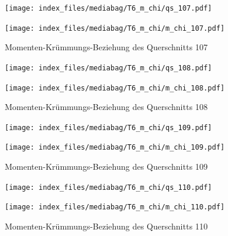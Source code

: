 \documentclass[
  11pt,
  letterpaper,
]{scrreprt}
\begin{document}
\begin{figure}[H]

\begin{minipage}{0.50\linewidth}
\texttt{[image: index\_files/mediabag/T6\_m\_chi/qs\_107.pdf]}\end{minipage}%
%
\begin{minipage}{0.50\linewidth}
\texttt{[image: index\_files/mediabag/T6\_m\_chi/m\_chi\_107.pdf]}\end{minipage}%

\caption{\label{fig-mchi_anhang}Momenten-Krümmungs-Beziehung des
Querschnitts 107}

\end{figure}%

\begin{figure}[H]

\begin{minipage}{0.50\linewidth}
\texttt{[image: index\_files/mediabag/T6\_m\_chi/qs\_108.pdf]}\end{minipage}%
%
\begin{minipage}{0.50\linewidth}
\texttt{[image: index\_files/mediabag/T6\_m\_chi/m\_chi\_108.pdf]}\end{minipage}%

\caption{\label{fig-mchi_anhang}Momenten-Krümmungs-Beziehung des
Querschnitts 108}

\end{figure}%

\begin{figure}[H]

\begin{minipage}{0.50\linewidth}
\texttt{[image: index\_files/mediabag/T6\_m\_chi/qs\_109.pdf]}\end{minipage}%
%
\begin{minipage}{0.50\linewidth}
\texttt{[image: index\_files/mediabag/T6\_m\_chi/m\_chi\_109.pdf]}\end{minipage}%

\caption{\label{fig-mchi_anhang}Momenten-Krümmungs-Beziehung des
Querschnitts 109}

\end{figure}%

\begin{figure}[H]

\begin{minipage}{0.50\linewidth}
\texttt{[image: index\_files/mediabag/T6\_m\_chi/qs\_110.pdf]}\end{minipage}%
%
\begin{minipage}{0.50\linewidth}
\texttt{[image: index\_files/mediabag/T6\_m\_chi/m\_chi\_110.pdf]}\end{minipage}%

\caption{\label{fig-mchi_anhang}Momenten-Krümmungs-Beziehung des
Querschnitts 110}

\end{figure}%
\end{document}
